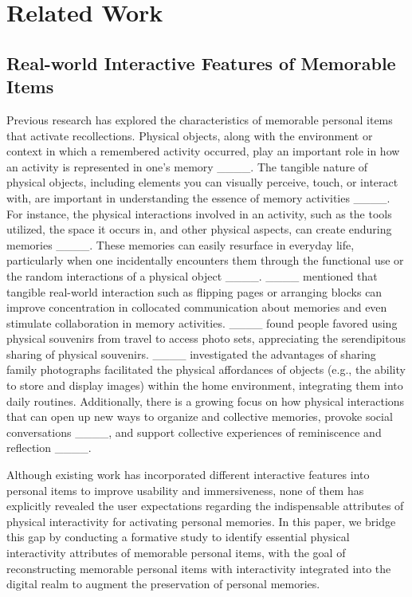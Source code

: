 \section{Related Work}
\subsection{Real-world Interactive Features of Memorable Items}

Previous research has explored the characteristics of memorable personal items that activate recollections. 
Physical objects, along with the environment or context in which a remembered activity occurred, play an important role in how an activity is represented in one's memory ____. 
The tangible nature of physical objects, including elements you can visually perceive, touch, or interact with, are important in understanding the essence of memory activities ____. 
For instance, the physical interactions involved in an activity, such as the tools utilized, the space it occurs in, and other physical aspects, can create enduring memories ____.
These memories can easily resurface in everyday life, particularly when one incidentally encounters them through the functional use or the random interactions of a physical object ____.  
____ mentioned that tangible real-world interaction such as flipping pages or arranging blocks can improve concentration in collocated communication about memories and even stimulate collaboration in memory activities. 
____ found people favored using physical souvenirs from travel to access photo sets, appreciating the serendipitous sharing of physical souvenirs.
____ investigated the advantages of sharing family photographs facilitated the physical affordances of objects (e.g., the ability to store and display images) within the home environment, integrating them into daily routines.
Additionally, there is a growing focus on how physical interactions that can open up new ways to organize and collective memories, provoke social conversations ____, and support collective experiences of reminiscence and reflection ____.

Although existing work has incorporated different interactive features into personal items to improve usability and immersiveness, none of them has explicitly revealed the user expectations regarding the indispensable attributes of physical interactivity for activating personal memories.
In this paper, we bridge this gap by conducting a formative study to identify essential physical interactivity attributes of memorable personal items, with the goal of reconstructing memorable personal items with interactivity integrated into the digital realm to augment the preservation of personal memories. 

